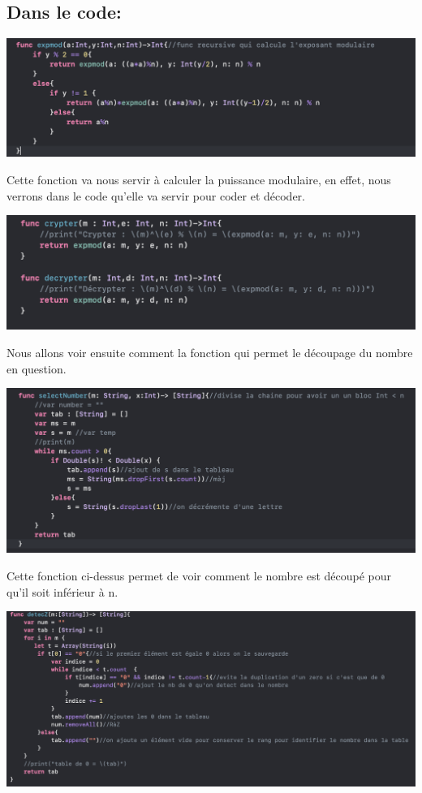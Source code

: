 \documentclass{article}
\begin{document}
\subsection{Dans le code:}
\begin{center}
    \includegraphics[scale=0.5]{EpxModRSA.png}
\end{center}
Cette fonction va nous servir à calculer la puissance modulaire, en effet, nous verrons dans le code qu'elle va servir pour coder et décoder.
\begin{center}
    \includegraphics[scale=0.5]{CryptDecrpytRSA.png}
\end{center}
Nous allons voir ensuite comment la fonction qui permet le découpage du nombre en question.
\begin{center}
    \includegraphics[scale=0.5]{SelectNRSA.png}
\end{center}
Cette fonction ci-dessus permet de voir comment le nombre est découpé pour qu'il soit inférieur à n.
\begin{center}
    \includegraphics[scale=0.5]{DetectZRSA.png}
\end{center}
\end{document}
